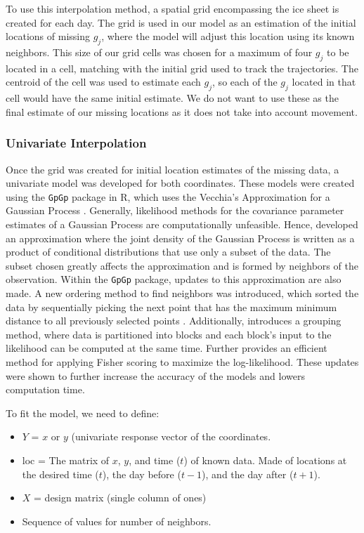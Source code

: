 \documentclass[12pt]{article}
\providecommand{\tightlist}{%
  \setlength{\itemsep}{0pt}\setlength{\parskip}{0pt}}
\begin{document}
To use this interpolation method, a spatial grid encompassing the ice
sheet is created for each day. The grid is used in our model as an
estimation of the initial locations of missing \(g_j\), where the model
will adjust this location using its known neighbors. This size of our
grid cells was chosen for a maximum of four \(g_j\) to be located in a
cell, matching with the initial grid used to track the trajectories. The
centroid of the cell was used to estimate each \(g_j\), so each of the
\(g_j\) located in that cell would have the same initial estimate. We do
not want to use these as the final estimate of our missing locations as
it does not take into account movement.

\hypertarget{univariate-interpolation}{%
\subsubsection{Univariate
Interpolation}\label{univariate-interpolation}}

Once the grid was created for initial location estimates of the missing
data, a univariate model was developed for both coordinates. These
models were created using the \texttt{GpGp} package in R, which uses the
Vecchia's Approximation for a Gaussian Process \citep{gpgp_pkg}.
Generally, likelihood methods for the covariance parameter estimates of
a Gaussian Process are computationally unfeasible. Hence,
\citet{vecchia1988estimation} developed an approximation where the joint
density of the Gaussian Process is written as a product of conditional
distributions that use only a subset of the data. The subset chosen
greatly affects the approximation and is formed by neighbors of the
observation. Within the \texttt{GpGp} package, updates to this
approximation are also made. A new ordering method to find neighbors was
introduced, which sorted the data by sequentially picking the next point
that has the maximum minimum distance to all previously selected points
\citep{guinness_permutation_2018}. Additionally,
\citet{guinness_permutation_2018} introduces a grouping method, where
data is partitioned into blocks and each block's input to the likelihood
can be computed at the same time. Further \citet{guinness_gaussian_2019}
provides an efficient method for applying Fisher scoring to maximize the
log-likelihood. These updates were shown to further increase the
accuracy of the models and lowers computation time.

To fit the model, we need to define:

\begin{itemize}
\tightlist
\item
  \(Y\) = \(x\) or \(y\) (univariate response vector of the coordinates.
\item
  loc = The matrix of \(x\), \(y\), and time (\(t\)) of known data. Made
  of locations at the desired time (\(t\)), the day before (\(t-1\)),
  and the day after (\(t+1\)).
\item
  \(X\) = design matrix (single column of ones)
\item
  Sequence of values for number of neighbors.
\end{itemize}
\end{document}
